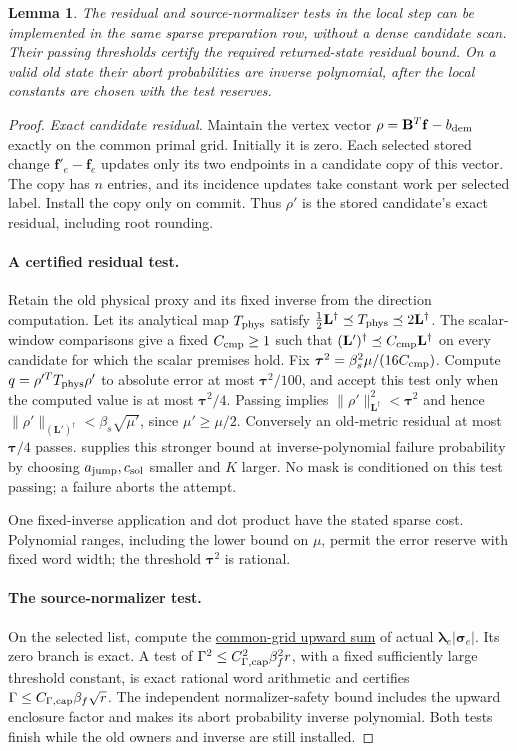 \documentclass[11pt]{article}
\newtheorem{lemma}[theorem]{Lemma}
\theoremstyle{remark}
\newcommand{\BB}{\mathbf B}
\newcommand{\LL}{\mathbf L}
\newcommand{\ff}{\mathbf f}
\newcommand{\llambda}{\boldsymbol{\lambda}}
\newcommand{\ttau}{\boldsymbol{\tau}}
\newcommand{\ssigma}{\boldsymbol{\sigma}}
\newcommand{\norm}[1]{\lVert#1\rVert}
\begin{document}
\begin{lemma}
\label{lem:ram27-candidate-tests}
The residual and source-normalizer tests in the local step can be implemented in
the same sparse preparation row, without a dense candidate scan.
Their passing thresholds certify the required returned-state residual bound.
On a valid old state their abort probabilities are inverse polynomial, after the
local constants are chosen with the test reserves.
\end{lemma} \begin{proof} \emph{Exact candidate residual.} Maintain the vertex
vector $\rho=\BB^T\ff-b_{\rm dem}$ exactly on the common primal grid.
Initially it is zero.
Each selected stored change $\ff'_e-\ff_e$ updates only its two endpoints in a
candidate copy of this vector.
The copy has $n$ entries, and its incidence updates take constant work per
selected label.
Install the copy only on commit.
Thus $\rho'$ is the stored candidate's exact residual, including root rounding.

\paragraph{A certified residual test.}
Retain the old physical proxy and its fixed inverse from the direction
computation.
Let its analytical map $T_{\rm phys}$ satisfy $\frac12\LL^\dagger\preceq T_{\rm
phys} \preceq2\LL^\dagger$.
The scalar-window comparisons give a fixed $C_{\rm cmp}\ge1$ such that
$(\LL')^\dagger\preceq C_{\rm cmp}\LL^\dagger$ on every candidate for which the
scalar premises hold.
Fix $\ttau^2=\beta_s^2\mu/(16C_{\rm cmp})$.
Compute $q=\rho'^TT_{\rm phys}\rho'$ to absolute error at most $\ttau^2/100$, and
accept this test only when the computed value is at most $\ttau^2/4$.
Passing implies $\norm{\rho'}_{\LL^\dagger}^2<\ttau^2$ and hence
$\norm{\rho'}_{(\LL')^\dagger}<\beta_s\sqrt{\mu'}$, since $\mu'\ge\mu/2$.
Conversely an old-metric residual at most $\ttau/4$ passes.
 supplies this stronger bound at inverse-polynomial
failure probability by choosing $a_{\rm jump},c_{\rm sol}$ smaller and $K$
larger.
No mask is conditioned on this test passing; a failure aborts the attempt.

One fixed-inverse application and dot product have the stated sparse cost.
Polynomial ranges, including the lower bound on $\mu$, permit the error reserve
with fixed word width; the threshold $\ttau^2$ is rational.

\paragraph{The source-normalizer test.}
On the selected list, compute the
\hyperref[par:ram30-source-normalizer]{common-grid upward sum} of actual
$\llambda_e|\ssigma_e|$.
Its zero branch is exact.
A test of $\Gamma^2\le C_{\Gamma,\rm cap}^2\beta_f^2r$, with a fixed
sufficiently large threshold constant, is exact rational word arithmetic and
certifies $\Gamma\le C_{\Gamma,\rm cap}\beta_f\sqrt r$.
The independent normalizer-safety bound includes the upward enclosure factor and
makes its abort probability inverse polynomial.
Both tests finish while the old owners and inverse are still installed.
\end{proof}
\end{document}
